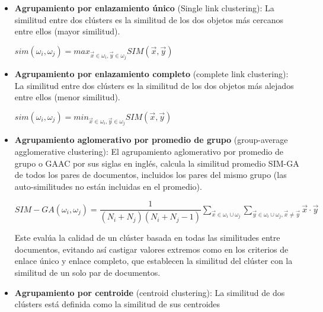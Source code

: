 \documentclass{llncs}
\begin{document}
\begin{itemize}
	\item \textbf{Agrupamiento por enlazamiento \'unico} (Single link clustering): La similitud entre dos cl\'usters es la similitud de los dos objetos más cercanos entre ellos (mayor similitud).
	
	\begin{center}
		$ sim(\omega_{i}, \omega_{j}) = max_{\overrightarrow{x} \in \omega_{i}, \overrightarrow{y} \in \omega_{j}} SIM(\overrightarrow{x}, \overrightarrow{y})$
	\end{center}
	
	\vspace{1em}
	\item \textbf{Agrupamiento por enlazamiento completo} (complete link clustering): La similitud entre dos cl\'usters es la similitud de los dos objetos más alejados entre ellos (menor similitud). 
	
	\begin{center}
		$ sim(\omega_{i}, \omega_{j}) = min_{\overrightarrow{x} \in \omega_{i}, \overrightarrow{y} \in \omega_{j}} SIM(\overrightarrow{x}, \overrightarrow{y})$
	\end{center}
	
	\vspace{1em}
	\item \textbf{Agrupamiento aglomerativo por promedio de grupo} (group-average agglomerative clustering): El agrupamiento aglomerativo por promedio de grupo o GAAC por sus siglas en ingl\'es, calcula la similitud promedio SIM-GA de todos los pares de documentos, incluidos los pares del mismo grupo (las auto-similitudes no están incluidas en el promedio).
	
	\begin{center}
	\footnotesize
	$ SIM-GA(\omega_{i}, \omega_{j}) = \dfrac{1}{(N_{i} + N_{j})(N_{i} + N_{j} - 1)} \sum_{\overrightarrow{x} \in \omega_{i} \cup \omega_{j}} \sum_{\overrightarrow{y} \in \omega_{i} \cup \omega_{j}, \overrightarrow{x} \neq \overrightarrow{y}} \overrightarrow{x} \cdot \overrightarrow{y} $
	\end{center}
	
	Este evalúa la calidad de un clúster basada en todas las similitudes entre documentos, evitando así castigar valores extremos como en los criterios de enlace único y enlace completo, que establecen la similitud del cl\'uster con la similitud de un solo par de documentos.
	
	\vspace{1em}
	\item \textbf{Agrupamiento por centroide} (centroid clustering): La similitud de dos cl\'usters est\'a definida como la similitud de sus centroides


\end{itemize}
\end{document}
